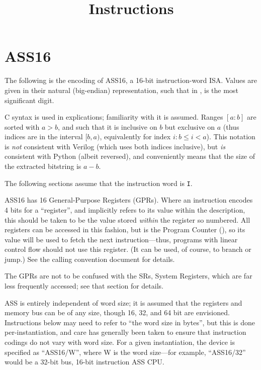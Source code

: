 

\title{Instructions}

\def\ins{{\tt I}}
\def\rg#1,#2.{$[#1:#2]$}
\def\ix#1{$[#1]$}

\chapter{ASS16}

The following is the encoding of ASS16, a 16-bit instruction-word ISA. Values
are given in their natural (big-endian) representation, such that in
,  is the most significant digit.

\bigskip
{
}
\bigskip

C syntax is used in explications; familiarity with it is assumed. Ranges
\rg a,b. are sorted with $a > b$, and such that it is inclusive on $b$ but
exclusive on $a$ (thus indices are in the interval $[b, a)$, equivalently for
index $i: b \le i < a$). This notation is {\it not} consistent with Verilog
(which uses both indices inclusive), but {\it is} consistent with Python
(albeit reversed), and conveniently means that the size of the extracted
bitstring is $a - b$.

The following sections assume that the instruction word is \ins.

ASS16 has 16 General-Purpose Registers (GPRs). Where an instruction encodes 4
bits for a ``register'', and implicitly refers to its value within the
description, this should be taken to be the value stored {\it within} the
register so numbered. All registers can be accessed in this fashion, but
 is the Program Counter (), so its value will be used to fetch
the next instruction---thus, programs with linear control flow should not use
this register. (It can be used, of course, to branch or jump.) See the calling
convention document for details.

The GPRs are not to be confused with the SRs, System Registers, which are far
less frequently accessed; see that section for details.

ASS is entirely independent of word size; it is assumed that the registers and
memory bus can be of any size, though 16, 32, and 64 bit are envisioned.
Instructions below may need to refer to ``the word size in bytes'', but this is
done per-instantiation, and care has generally been taken to ensure that
instruction codings do not vary with word size. For a given instantiation, the
device is specified as ``ASS16/W'', where W is the word size---for example,
``ASS16/32'' would be a 32-bit bus, 16-bit instruction ASS CPU.

